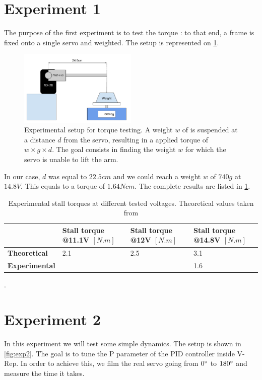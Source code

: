 \section{Experiment 1 \label{sec:exp1}}
The purpose of the first experiment is to test the torque : to that end, a frame is fixed onto a single servo and weighted. The setup is represented on \cref{fig:exp1}.

\begin{figure}[htp]
\center
    \includegraphics[width = 0.5\textwidth]{figures/exp1}
    \caption[Experimental setup for torque testing]{Experimental setup for torque testing. A weight $w$ of is suspended at a distance $d$ from the servo, resulting in a applied torque of $w \times g \times d$. The goal consists in finding the weight $w$ for which the servo is unable to lift the arm.}
    \label{fig:exp1}
\end{figure}

In our case, $d$ was equal to $22.5cm$ and we could reach a weight $w$ of $740g$ at $14.8V$. This equals to a torque of $1.64Ncm$. The complete results are listed in \cref{table:exp1_results}.
\begin{table}[htp]
\center
\begin{tabularx}{\textwidth}{@{}l X X X @{}}
\toprule
& \textbf{Stall torque @11.1V $[N.m]$} & \textbf{Stall torque @12V $[N.m]$} & \textbf{Stall torque @14.8V $[N.m]$}\\ 
\midrule
\textbf{Theoretical} & 2.1 & 2.5 & 3.1\\ 
\textbf{Experimental} &  &  & 1.6\\ 
\bottomrule
\end{tabularx}
\caption[Results of experiment 1]{Experimental stall torques at different tested voltages. Theoretical values taken from \cite{mx_28_manual}}.
\label{table:exp1_results}
\end{table}

\section{Experiment 2}
In this experiment we will test some simple dynamics. The setup is shown in \cref{fig:exp2}. The goal is to tune the P parameter of the PID controller inside V-Rep. In order to achieve this, we film the real servo going from $0\degree$ to $180\degree$ and measure the time it takes. 

